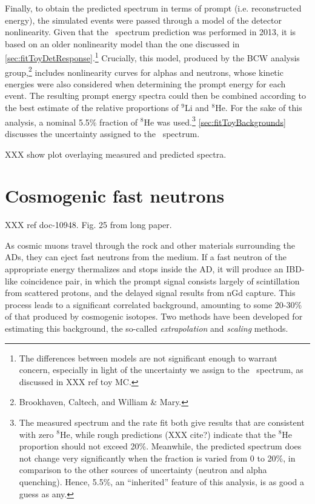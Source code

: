 \documentclass[../thesis.tex]{subfiles}
\begin{document}
Finally, to obtain the predicted spectrum in terms of prompt (i.e. reconstructed
energy), the simulated events were passed through a model of the detector
nonlinearity. Given that the \LiHe\ spectrum prediction was performed in 2013,
it is based on an older nonlinearity model than the one discussed in
\autoref{sec:fitToyDetResponse}.\footnote{The differences between models are not
  significant enough to warrant concern, especially in light of the uncertainty
  we assign to the \LiHe\ spectrum, as discussed in XXX ref toy MC.} Crucially,
this model, produced by the BCW analysis group,\footnote{Brookhaven, Caltech,
  and William \& Mary.} includes nonlinearity curves for alphas and neutrons,
whose kinetic energies were also considered when determining the prompt energy
for each event. The resulting prompt energy spectra could then be combined
according to the best estimate of the relative proportions of $^9$Li and
$^8$He. For the sake of this analysis, a nominal 5.5\% fraction of $^8$He was
used.\footnote{The measured spectrum and the rate fit both give results that are
  consistent with zero $^8$He, while rough predictions (XXX cite?) indicate that
  the $^8$He proportion should not exceed 20\%. Meanwhile, the predicted
  spectrum does not change very significantly when the fraction is varied from 0
  to 20\%, in comparison to the other sources of uncertainty (neutron and alpha
  quenching). Hence, 5.5\%, an ``inherited'' feature of this analysis, is as
  good a guess as any.} \autoref{sec:fitToyBackgrounds} discusses the
uncertainty assigned to the \LiHe\ spectrum.

XXX show plot overlaying measured and predicted spectra.

\section{Cosmogenic fast neutrons}
\label{sec:bkgFastn}

XXX ref doc-10948. Fig. 25 from long paper.

As cosmic muons travel through the rock and other materials surrounding the ADs,
they can eject fast neutrons from the medium. If a fast neutron of the
appropriate energy thermalizes and stops inside the AD, it will produce an
IBD-like coincidence pair, in which the prompt signal consists largely of
scintillation from scattered protons, and the delayed signal results from nGd
capture. This process leads to a significant correlated background, amounting to
some 20-30\% of that produced by cosmogenic isotopes. Two methods have been
developed for estimating this background, the so-called \emph{extrapolation} and
\emph{scaling} methods.
\end{document}
